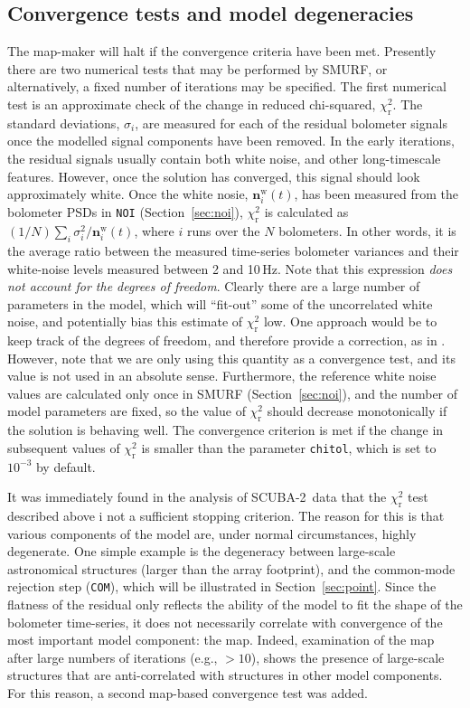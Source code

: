 \documentclass[useAMS,usenatbib,nofootinbib]{mn2e}
\newcommand{\scuba}{SCUBA-2}
\newcommand{\model}[1]{\texttt{#1}}
\begin{document}
\subsection{Convergence tests and model degeneracies}
\label{sec:converge}

The map-maker will halt if the convergence criteria have been
met. Presently there are two numerical tests that may be performed by
SMURF, or alternatively, a fixed number of iterations may be
specified. The first numerical test is an approximate check of the
change in reduced chi-squared, $\chi^2_\mathrm{r}$. The standard
deviations, $\sigma_i$, are measured for each of the residual
bolometer signals once the modelled signal components have been
removed. In the early iterations, the residual signals usually contain
both white noise, and other long-timescale features. However, once the
solution has converged, this signal should look approximately
white. Once the white nosie, $\mathbf{n}^\mathrm{w}_i(t)$, has been
measured from the bolometer PSDs in \model{NOI}
(Section~\ref{sec:noi}), $\chi^2_\mathrm{r}$ is calculated as $(1/N)
\sum_i \sigma^2_i / \mathbf{n}^\mathrm{w}_i(t)$, where $i$ runs over
the $N$ bolometers. In other words, it is the average ratio between
the measured time-series bolometer variances and their white-noise
levels measured between 2 and 10\,Hz. Note that this expression
\emph{does not account for the degrees of freedom}. Clearly there are
a large number of parameters in the model, which will ``fit-out'' some
of the uncorrelated white noise, and potentially bias this estimate of
$\chi^2_\mathrm{r}$ low. One approach would be to keep track of the
degrees of freedom, and therefore provide a correction, as in
\citet{kovacs2008}. However, note that we are only using this quantity
as a convergence test, and its value is not used in an absolute
sense. Furthermore, the reference white noise values are calculated
only once in SMURF (Section~\ref{sec:noi}), and the number of model
parameters are fixed, so the value of $\chi^2_\mathrm{r}$ should
decrease monotonically if the solution is behaving well. The
convergence criterion is met if the change in subsequent values of
$\chi^2_\mathrm{r}$ is smaller than the parameter \texttt{chitol},
which is set to $10^{-3}$ by default.

It was immediately found in the analysis of \scuba\ data that the
$\chi^2_\mathrm{r}$ test described above i not a sufficient stopping
criterion. The reason for this is that various components of the model
are, under normal circumstances, highly degenerate. One simple example
is the degeneracy between large-scale astronomical structures (larger
than the array footprint), and the common-mode rejection step
(\model{COM}), which will be illustrated in
Section~\ref{sec:point}. Since the flatness of the residual only
reflects the ability of the model to fit the shape of the bolometer
time-series, it does not necessarily correlate with convergence of the
most important model component: the map. Indeed, examination of the
map after large numbers of iterations (e.g., $>10$), shows the
presence of large-scale structures that are anti-correlated with
structures in other model components. For this reason, a second
map-based convergence test was added.
\end{document}

